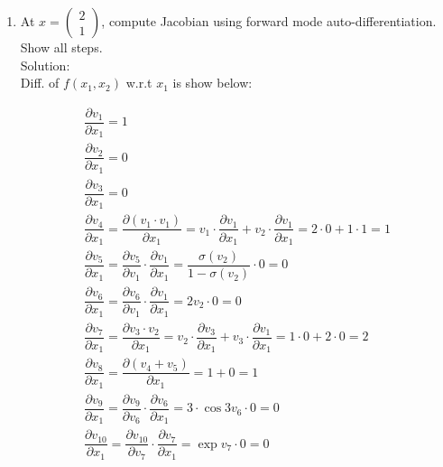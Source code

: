 \documentclass[12pt]{article}
\begin{document}
\begin{enumerate}[label=(\roman*)]
\newpage
\item At 
$x=
\begin{pmatrix}
2\\1
\end{pmatrix}$,
compute Jacobian using forward mode auto-differentiation. Show all steps.\\
Solution:\\
Diff. of $f(x_1, x_2)$ w.r.t $x_1$ is show below:\\

\begin{fleqn}
    \begin{gather*}
        \dfrac{\partial v_{1}}{\partial x_{1}} =  1 \\
        \dfrac{\partial v_{2}}{\partial x_{1}} =  0  \\
        \dfrac{\partial v_{3}}{\partial x_{1}} = 0  \\
        \dfrac{\partial v_{4}}{\partial x_{1}} = \dfrac{\partial (v_{1}\cdot v_1)}{\partial x_{1}} = v_1\cdot\dfrac{\partial v_{1}}{\partial x_{1}} + v_2\cdot\dfrac{\partial v_{1}}{\partial x_{1}} = 2\cdot 0 + 1\cdot 1 = 1   \\
        \dfrac{\partial v_{5}}{\partial x_{1}} = \dfrac{\partial v_{5}}{\partial v_{1}}\cdot \dfrac{\partial v_{1}}{\partial x_{1}} =  \dfrac{\sigma(v_2)}{1-\sigma(v_2)} \cdot 0 = 0  \\ 
        \dfrac{\partial v_{6}}{\partial x_{1}} = \dfrac{\partial v_{6}}{\partial v_{1}} \cdot \dfrac{\partial v_{1}}{\partial x_{1}} = 2 v_2 \cdot 0 = 0 \\
        \dfrac{\partial v_{7}}{\partial x_{1}} = \dfrac{\partial v_{3}\cdot v_2}{\partial x_{1}} = v_2 \cdot \dfrac{\partial v_{3}}{\partial x_{1}} + v_3 \cdot \dfrac{\partial v_{1}}{\partial x_{1}} = 1 \cdot 0 + 2 \cdot 0 = 2 \\ 
        \dfrac{\partial v_{8}}{\partial x_{1}} = \dfrac{\partial (v_{4} + v_5)}{\partial x_{1}} = 1 + 0 = 1  \\
        \dfrac{\partial v_{9}}{\partial x_{1}} = \dfrac{\partial v_{9}}{\partial v_{6}} \cdot \dfrac{\partial v_{6}}{\partial x_{1}} = 3 \cdot \cos{3v_6} \cdot 0 =  0  \\
        \dfrac{\partial v_{10}}{\partial x_{1}} = \dfrac{\partial v_{10}}{\partial v_{7}} \cdot \dfrac{\partial v_{7}}{\partial x_{1}}  = \exp{v_7} \cdot 0 = 0  \\

\end{gather*}
\end{fleqn}
\end{enumerate}
\end{document}
